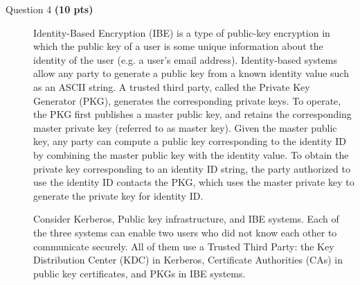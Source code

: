 \documentclass[11pt]{article}
\begin{document}
\begin{description}
\begin{description}
\end{description}


 \item[Question 4 \textbf{(10 pts)}]
Identity-Based Encryption (IBE) is a type of public-key encryption in which the public key of a user is some unique information about the identity of the user (e.g. a user's email address).  Identity-based systems allow any party to generate a public key from a known identity value such as an ASCII string. A trusted third party, called the Private Key Generator (PKG), generates the corresponding private keys. To operate, the PKG first publishes a master public key, and retains the corresponding master private key (referred to as master key). Given the master public key, any party can compute a public key corresponding to the identity ID by combining the master public key with the identity value. To obtain the private key corresponding to an identity ID string, the party authorized to use the identity ID contacts the PKG, which uses the master private key to generate the private key for identity ID.

Consider Kerberos, Public key infrastructure, and IBE systems.  Each of the three systems can enable two users who did not know each other to communicate securely.  All of them use a Trusted Third Party: the Key Distribution Center (KDC) in Kerberos, Certificate Authorities (CAs) in public key certificates, and PKGs in IBE systems.


\end{description}
\end{document}
